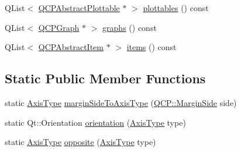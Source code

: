 \begin{DoxyCompactItemize}
\item 
Q\+List$<$ \mbox{\hyperlink{class_q_c_p_abstract_plottable}{Q\+C\+P\+Abstract\+Plottable}} $\ast$ $>$ \mbox{\hyperlink{class_q_c_p_axis_ac5e0f6f65c75efb5fd32275d6e4ef0d6}{plottables}} () const
\item 
Q\+List$<$ \mbox{\hyperlink{class_q_c_p_graph}{Q\+C\+P\+Graph}} $\ast$ $>$ \mbox{\hyperlink{class_q_c_p_axis_ad590c0da223697a2727f97a520870fec}{graphs}} () const
\item 
Q\+List$<$ \mbox{\hyperlink{class_q_c_p_abstract_item}{Q\+C\+P\+Abstract\+Item}} $\ast$ $>$ \mbox{\hyperlink{class_q_c_p_axis_a42761bc68e2f3a9f68549d45b73f705b}{items}} () const
\end{DoxyCompactItemize}
\subsection*{Static Public Member Functions}
\begin{DoxyCompactItemize}
\item 
static \mbox{\hyperlink{class_q_c_p_axis_ae2bcc1728b382f10f064612b368bc18a}{Axis\+Type}} \mbox{\hyperlink{class_q_c_p_axis_ac0a6b77bd52bec6c81cd62d167cfeba6}{margin\+Side\+To\+Axis\+Type}} (\mbox{\hyperlink{namespace_q_c_p_a7e487e3e2ccb62ab7771065bab7cae54}{Q\+C\+P\+::\+Margin\+Side}} side)
\item 
static Qt\+::\+Orientation \mbox{\hyperlink{class_q_c_p_axis_a9a68b3e45f1b1e33d4d807822342516c}{orientation}} (\mbox{\hyperlink{class_q_c_p_axis_ae2bcc1728b382f10f064612b368bc18a}{Axis\+Type}} type)
\item 
static \mbox{\hyperlink{class_q_c_p_axis_ae2bcc1728b382f10f064612b368bc18a}{Axis\+Type}} \mbox{\hyperlink{class_q_c_p_axis_aa85ba73dfee6483e23825461b725e363}{opposite}} (\mbox{\hyperlink{class_q_c_p_axis_ae2bcc1728b382f10f064612b368bc18a}{Axis\+Type}} type)
\end{DoxyCompactItemize}

